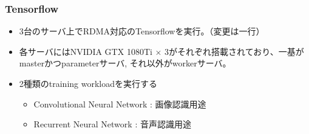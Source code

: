 \documentclass[dvipdfmx,9pt,notheorems]{beamer}
\theoremstyle{definition}
\begin{document}
\begin{frame}\frametitle{Tensorflow}
	\begin{itemize}
		\item 3台のサーバ上でRDMA対応のTensorflowを実行。（{\color{orange}変更は一行}）
		\item 各サーバにはNVIDIA GTX 1080Ti $\times$ 3がそれぞれ搭載されており、一基がmasterかつparameterサーバ, それ以外がworkerサーバ。
		\item 2種類のtraining workloadを実行する
		\begin{itemize}
			\item Convolutional Neural Network : 画像認識用途
			\item Recurrent Neural Network : 音声認識用途
		\end{itemize}
	\end{itemize}
\end{frame}
\end{document}
